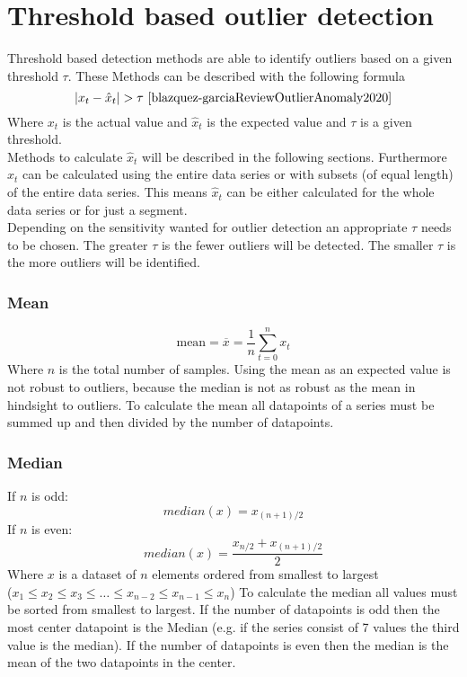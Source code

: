 \section{Threshold based outlier detection}\label{section:threshold-based-outlier-detection}
Threshold based detection methods are able to identify outliers based on a given threshold $\tau$. These Methods can be described with the following formula
$$
|x_t - \hat{x}_t | > \tau \text{ \cite{blazquez-garciaReviewOutlierAnomaly2020}}
$$
Where $x_t$ is the actual value and $\hat{x}_t$ is the expected value and $\tau$ is a given threshold.\\
Methods to calculate $\hat{x}_t$ will be described in the following sections. Furthermore $\hat{x}_t$ can be calculated using the entire data series or with subsets (of equal length) of the entire data series. This means $\hat{x}_t$ can be either calculated for the whole data series or for just a segment.\\
Depending on the sensitivity wanted for outlier detection an appropriate $\tau$ needs to be chosen. The greater $\tau$ is the fewer outliers will be detected. The smaller $\tau$ is the more outliers will be identified.  \cite{blazquez-garciaReviewOutlierAnomaly2020}

\subsubsection{Mean}
$$
\text{mean} = \overline{x} = \frac{1}{n} \sum^n_{t=0}x_t
$$
Where $n$ is the total number of samples. Using the mean as an expected value is not robust to outliers, because the median is not as robust as the mean in hindsight to outliers. To calculate the mean all datapoints of a series must be summed up and then divided by the number of datapoints.
\subsubsection{Median}
If $n$ is odd:
$$
median(x) = x_{(n+1)/2}
$$
If $n$ is even:
$$
median(x) = \frac{x_{n/2} + x_{(n+1)/2}}{2}
$$
Where $x$ is a dataset of $n$ elements ordered from smallest to largest\\
($x_1 \leq x_2 \leq x_3 \leq \ldots \leq x_{n-2} \leq x_{n-1} \leq x_n$)
\cite{blazquez-garciaReviewOutlierAnomaly2020}
To calculate the median all values must be sorted from smallest to largest. If the number of datapoints is odd then the most center datapoint is the Median (e.g. if the series consist of 7 values the third value is the median). If the number of datapoints is even then the median is the mean of the two datapoints in the center.
